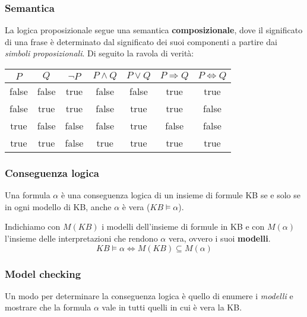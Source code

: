 \subsubsection{Semantica}
La logica proposizionale segue una semantica \textbf{composizionale}, dove il significato di una frase è determinato dal significato dei suoi componenti a partire dai \textit{simboli proposizionali}. Di seguito la ravola di verità:
\begin{table}[h!]
	\centering
	\begin{tabular}{|cc|ccccc|}
		\hline
		$P$ & $Q$ & $\neg P$ & $P \land Q$ & $P \lor Q$ & $ P \Rightarrow Q$ & $P \Leftrightarrow Q$\\
		\hline
		false & false & true & false & false & true & true \\
		false & true & true & false & true & true & false \\
		true & false & false & false & true & false & false \\
		true & true & false & true & true & true & true\\
		\hline
	\end{tabular}
\end{table}

\subsubsection{Conseguenza logica}
\begin{definition}
	Una formula $\alpha$ è una conseguenza logica di un insieme di formule KB se e solo se in ogni modello di KB, anche $\alpha$ è vera ($KB \models \alpha$).
\end{definition}
Indichiamo con $M(KB)$ i modelli dell'insieme di formule in KB e con $M(\alpha)$ l'insieme delle interpretazioni che rendono $\alpha$ vera, ovvero i suoi \textbf{modelli}.
\begin{equation}
	KB \models \alpha \Leftrightarrow M(KB) \subseteq M(\alpha)
\end{equation}

\subsubsection{Model checking}
Un modo per determinare la conseguenza logica è quello di enumere i \textit{modelli} e mostrare che la formula $\alpha$ vale in tutti quelli in cui è vera la KB.

